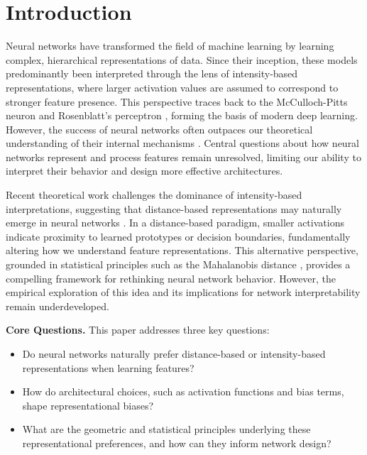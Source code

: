 \section{Introduction}

Neural networks have transformed the field of machine learning by learning complex, hierarchical representations of data. Since their inception, these models predominantly been interpreted through the lens of intensity-based representations, where larger activation values are assumed to correspond to stronger feature presence. This perspective traces back to the McCulloch-Pitts neuron \cite{mcculloch1943logical} and Rosenblatt's perceptron \cite{rosenblatt1958perceptron}, forming the basis of modern deep learning. However, the success of neural networks often outpaces our theoretical understanding of their internal mechanisms \cite{lipton2018mythos}. Central questions about how neural networks represent and process features remain unresolved, limiting our ability to interpret their behavior and design more effective architectures.

Recent theoretical work challenges the dominance of intensity-based interpretations, suggesting that distance-based representations may naturally emerge in neural networks \cite{oursland2024interpreting}. In a distance-based paradigm, smaller activations indicate proximity to learned prototypes or decision boundaries, fundamentally altering how we understand feature representations. This alternative perspective, grounded in statistical principles such as the Mahalanobis distance \cite{mahalanobis1936generalized}, provides a compelling framework for rethinking neural network behavior. However, the empirical exploration of this idea and its implications for network interpretability remain underdeveloped.

\textbf{Core Questions.} This paper addresses three key questions:
\begin{itemize}
    \item Do neural networks naturally prefer distance-based or intensity-based representations when learning features?
    \item How do architectural choices, such as activation functions and bias terms, shape representational biases?
    \item What are the geometric and statistical principles underlying these representational preferences, and how can they inform network design?
\end{itemize}

